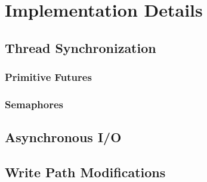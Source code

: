 \section{Implementation Details}

\subsection{Thread Synchronization}\label{sec:threadsync}

\subsubsection{Primitive Futures}

\subsubsection{Semaphores}

\subsection{Asynchronous I/O}

\subsection{Write Path Modifications}
